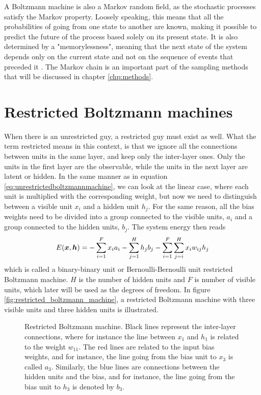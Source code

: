 A Boltzmann machine is also a Markov random field, as the stochastic processes satisfy the Markov property. Loosely speaking, this means that all the probabilities of going from one state to another are known, making it possible to predict the future of the process based solely on its present state. It is also determined by a "memorylessness", meaning that the next state of the system depends only on the current state and not on the sequence of events that preceded it \cite{fischer_training_2014}. The Markov chain is an important part of the sampling methods that will be discussed in chapter \ref{chp:methods}.

\section{Restricted Boltzmann machines} \label{sec:RBM}
When there is an unrestricted guy, a restricted guy must exist as well. What the term restricted means in this context, is that we ignore all the connections between units in the same layer, and keep only the inter-layer ones. Only the units in the first layer are the observable, while the units in the next layer are latent or hidden. In the same manner as in equation \eqref{eq:unrestrictedboltzmannmachine}, we can look at the linear case, where each unit is multiplied with the corresponding weight, but now we need to distinguish between a visible unit $x_i$ and a hidden unit $h_j$. For the same reason, all the bias weights need to be divided into a group connected to the visible units, $a_i$ and a group connected to the hidden units, $b_j$. The system energy then reads
\begin{equation}
E(\boldsymbol{{x}},\boldsymbol{{h}})=- \sum_{i=1}^Fx_ia_i- \sum_{j=1}^Hh_jb_j-\sum_{i=1}^F\sum_{j=i}^H x_iw_{ij}h_j 
\label{eq:binarybinary}
\end{equation}
which is called a binary-binary unit or Bernoulli-Bernoulli unit restricted Boltzmann machine. $H$ is the number of hidden units and $F$ is number of visible units, which later will be used as the degrees of freedom. In figure \eqref{fig:restricted_boltzmann_machine}, a restricted Boltzmann machine with three visible units and three hidden units is illustrated.

\begin{figure}
	\centering
	
	\caption{Restricted Boltzmann machine. Black lines represent the inter-layer connections, where for instance the line between $x_1$ and $h_1$ is related to the weight $w_{11}$. The red lines are related to the input bias weights, and for instance, the line going from the bias unit to $x_3$ is called $a_3$. Similarly, the blue lines are connections between the hidden units and the bias, and for instance, the line going from the bias unit to $h_3$ is denoted by $b_3$.}
	\label{fig:restricted_boltzmann_machine}
\end{figure}

